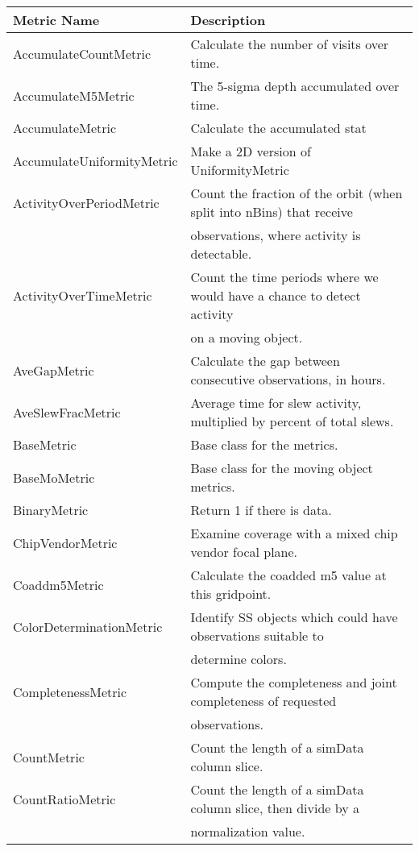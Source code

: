 \begin{table}
\scriptsize
\begin{tabular}{ll}
\hline
                Metric Name &                                                             Description \\
\hline
 AccumulateCountMetric &  Calculate the number of visits over time. \\
 AccumulateM5Metric &  The 5-sigma depth accumulated over time. \\
 AccumulateMetric &  Calculate the accumulated stat \\
 AccumulateUniformityMetric &  Make a 2D version of UniformityMetric \\
 ActivityOverPeriodMetric &  Count the fraction of the orbit (when split into nBins) that receive \\
  &  observations, where activity is detectable. \\
 ActivityOverTimeMetric &  Count the time periods where we would have a chance to detect activity \\
  &  on a moving object. \\
 AveGapMetric &  Calculate the gap between consecutive observations, in hours. \\
 AveSlewFracMetric &  Average time for slew activity, multiplied by percent of total slews. \\
 BaseMetric &  Base class for the metrics. \\
 BaseMoMetric &  Base class for the moving object metrics. \\
 BinaryMetric &  Return 1 if there is data. \\
 ChipVendorMetric &  Examine coverage with a mixed chip vendor focal plane. \\
 Coaddm5Metric &  Calculate the coadded m5 value at this gridpoint. \\
 ColorDeterminationMetric &  Identify SS objects which could have observations suitable to \\
  &  determine colors. \\
 CompletenessMetric &  Compute the completeness and joint completeness of requested \\
  &  observations. \\
 CountMetric &  Count the length of a simData column slice. \\
 CountRatioMetric &  Count the length of a simData column slice, then divide by a \\
  &  normalization value. \\

\end{tabular}
\end{table}
